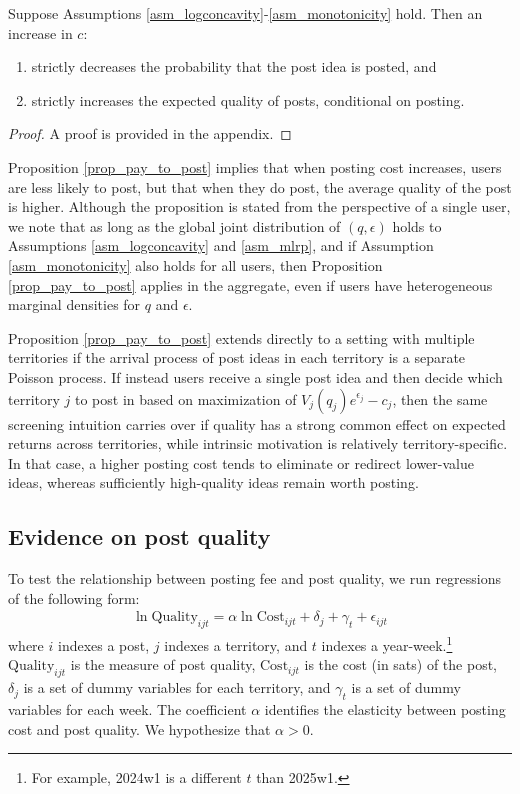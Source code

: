 \begin{proposition} \label{prop_pay_to_post}
Suppose Assumptions \ref{asm_logconcavity}-\ref{asm_monotonicity} hold. Then an increase in $c$:
\begin{enumerate}[label=(\roman*)]
\item strictly decreases the probability that the post idea is posted, and
\item strictly increases the expected quality of posts, conditional on posting.
\end{enumerate}
\end{proposition}

\begin{proof}
A proof is provided in the appendix.
\end{proof}

Proposition \ref{prop_pay_to_post} implies that when posting cost increases, users are less likely to post, but that when they do post, the average quality of the post is higher. Although the proposition is stated from the perspective of a single user, we note that as long as the global joint distribution of $(q,\epsilon)$ holds to Assumptions \ref{asm_logconcavity} and \ref{asm_mlrp}, and if Assumption \ref{asm_monotonicity} also holds for all users, then Proposition \ref{prop_pay_to_post} applies in the aggregate, even if users have heterogeneous marginal densities for $q$ and $\epsilon$.  

Proposition \ref{prop_pay_to_post} extends directly to a setting with multiple territories if the arrival process of post ideas in each territory is a separate Poisson process. If instead users receive a single post idea and then decide which territory $j$ to post in based on maximization of $V_j(q_j)e^{\epsilon_j} - c_j$, then the same screening intuition carries over if quality has a strong common effect on expected returns across territories, while intrinsic motivation is relatively territory-specific. In that case, a higher posting cost tends to eliminate or redirect lower-value ideas, whereas sufficiently high-quality ideas remain worth posting.



\subsection{Evidence on post quality}

To test the relationship between posting fee and post quality, we run regressions of the following form:
\begin{align}
\ln \text{Quality}_{ijt} = \alpha \ln \text{Cost}_{ijt} + \delta_{j} + \gamma_{t} + \epsilon_{ijt} \label{eq_qual_reg}
\end{align}
where $i$ indexes a post, $j$ indexes a territory, and $t$ indexes a year-week.\footnote{For example, 2024w1 is a different $t$ than 2025w1.} $\text{Quality}_{ijt}$ is the measure of post quality, $\text{Cost}_{ijt}$ is the cost (in sats) of the post, $\delta_{j}$ is a set of dummy variables for each territory, and $\gamma_{t}$ is a set of dummy variables for each week. The coefficient $\alpha$ identifies the elasticity between posting cost and post quality. We hypothesize that $\alpha > 0$.

